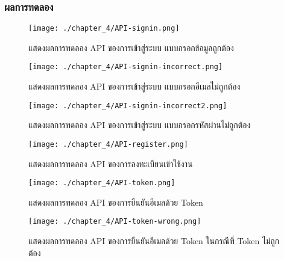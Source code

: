 \subsubsection{ผลการทดลอง}
\begin{figure}
	\texttt{[image: ./chapter\_4/API-signin.png]}
	\caption{แสดงผลการทดลอง API ของการเข้าสู่ระบบ แบบกรอกข้อมูลถูกต้อง}
\end{figure}
\begin{figure}
	\texttt{[image: ./chapter\_4/API-signin-incorrect.png]}
	\caption{แสดงผลการทดลอง API ของการเข้าสู่ระบบ แบบกรอกอีเมลไม่ถูกต้อง}
\end{figure}
\begin{figure}
	\texttt{[image: ./chapter\_4/API-signin-incorrect2.png]}
	\caption{แสดงผลการทดลอง API ของการเข้าสู่ระบบ แบบกรอกรหัสผ่านไม่ถูกต้อง}
\end{figure}
\begin{figure}
	\texttt{[image: ./chapter\_4/API-register.png]}
	\caption{แสดงผลการทดลอง API ของการลงทะเบียนเข้าใช้งาน}
\end{figure}
\begin{figure}
	\texttt{[image: ./chapter\_4/API-token.png]}
	\caption{แสดงผลการทดลอง API ของการยืนยันอีเมลด้วย Token}
\end{figure}
\begin{figure}
	\texttt{[image: ./chapter\_4/API-token-wrong.png]}
	\caption{แสดงผลการทดลอง API ของการยืนยันอีเมลด้วย Token ในกรณีที่ Token ไม่ถูกต้อง}
\end{figure}















